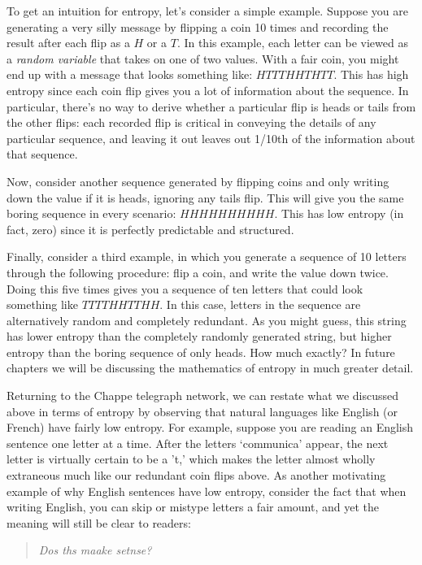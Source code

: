 \documentclass[UTF8]{book}
\begin{document}
\begin{CJK}{UTF8}{gbsn}
To get an intuition for entropy, let's consider a simple example. Suppose you are generating a very silly message by flipping a coin 10 times and recording the result after each flip as a $H$ or a $T$. In this example, each letter can be viewed as a \emph{random variable} that takes on one of two values. With a fair coin, you might end up with a message that looks something like: $HTTTHHTHTT$. This has high entropy since each coin flip gives you a lot of information about the sequence. In particular, there's no way to derive whether a particular flip is heads or tails from the other flips: each recorded flip is critical in conveying the details of any particular sequence, and leaving it out leaves out 1/10th of the information about that sequence.

Now, consider another sequence generated by flipping coins and only writing down the value if it is heads, ignoring any tails flip. This will give you the same boring sequence in every scenario: $HHHHHHHHHH$. This has low entropy (in fact, zero) since it is perfectly predictable and structured.

Finally, consider a third example, in which you generate a sequence of 10 letters through the following procedure: flip a coin, and write the value down twice. Doing this five times gives you a sequence of ten letters that could look something like $TTTTHHTTHH$. In this case, letters in the sequence are alternatively random and completely redundant. As you might guess, this string has lower entropy than the completely randomly generated string, but higher entropy than the boring sequence of only heads. How much exactly? In future chapters we will be discussing the mathematics of entropy in much greater detail.

Returning to the Chappe telegraph network, we can restate what we discussed above in terms of entropy by observing that natural languages like English (or French) have fairly low entropy. For example, suppose you are reading an English sentence one letter at a time. After the letters `communica' appear, the next letter is virtually certain to be a 't,' which makes the letter almost wholly extraneous much like our redundant coin flips above. As another motivating example of why English sentences have low entropy, consider the fact that when writing English, you can skip or mistype letters a fair amount, and yet the meaning will still be clear to readers:

\begin{quotation}
\centering
\emph{Dos ths maake setnse?}
\end{quotation}


\end{CJK}
\end{document}
